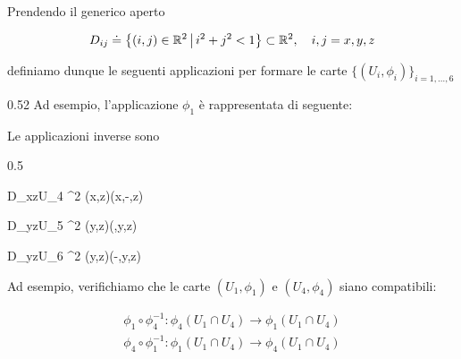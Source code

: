 Prendendo il generico aperto

\begin{equation}
	D_{ij} \doteq \left\{ (i,j) \in \R^{2} \st i^{2}+j^{2}<1 \right\} \subset \R^{2} \qcomma i,j = x,y,z
\end{equation}

definiamo dunque le seguenti applicazioni per formare le carte $ \{(U_{i},\phi_{i})\}_{i=1,\dots,6} $

		{0.52}{%
			Ad esempio, l'applicazione $ \phi_{1} $ è rappresentata di seguente:
		}

Le applicazioni inverse sono

	{0.5}{%
				{D_{xz}}{U_{4} \subset \R^{2}}
				{(x,z)}{(x,-,z)}
			
				{D_{yz}}{U_{5} \subset \R^{2}}
				{(y,z)}{(,y,z)}
			
				{D_{yz}}{U_{6} \subset \R^{2}}
				{(y,z)}{(-,y,z)}
			}

Ad esempio, verifichiamo che le carte $ (U_{1},\phi_{1}) $ e $ (U_{4},\phi_{4}) $ siano compatibili:

\begin{gather}
	\phi_{1} \circ \phi_{4}^{-1} : \phi_{4}(U_{1} \cap U_{4}) \to \phi_{1}(U_{1} \cap U_{4})\\
	\phi_{4} \circ \phi_{1}^{-1} : \phi_{1}(U_{1} \cap U_{4}) \to \phi_{4}(U_{1} \cap U_{4})
\end{gather}

